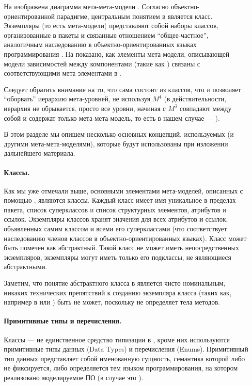 На  изображена диаграмма мета-мета-модели . Согласно объектно-ориентированной парадигме, центральным понятием в  является класс. Экземпляры  (то есть мета-модели) представляют собой наборы классов, организованные в пакеты и связанные отношением ``общее-частное'', аналогичным наследованию в объектно-ориентированных языках программирования \cite{OOP}. На  показано, как элементы мета-модели, описывающей модели зависимостей между компонентами (такие как ) связаны с соответствующими мета-элементами в .

Следует обратить внимание на то, что  сама состоит из классов, что и позволяет ``оборвать'' иерархию мета-уровней, не используя $M^4$ (в действительности, иерархия не обрывается, просто все уровни, начиная с $M^3$ совпадают между собой и содержат только мета-мета-модель, то есть в нашем случае --- ).

В этом разделе мы опишем несколько основных концепций, используемых  (и другими мета-мета-моделями), которые будут использованы при изложении дальнейшего материала.

\paragraph*{Классы.} Как мы уже отмечали выше, основными элементами мета-моделей, описанных с помощью , являются классы. Каждый класс имеет имя уникальное в пределах пакета, список суперклассов и список структурных элементов, атрибутов и ссылок. Экземпляры классов хранят значения для всех атрибутов и ссылок, объявленных самим классом и всеми его суперклассами (что соответствует наследованию членов классов в объектно-ориентированных языках). Класс может быть помечен как абстрактный. Такой класс не может иметь непосредственных экземпляров, экземпляры могут иметь только его подклассы, не являющиеся абстрактными.

Заметим, что понятие абстрактного класса в  является чисто номинальным, никаких технических препятствий к созданию экземпляра класса (таких как, например в  или ) быть не может, поскольку  не определяет тела методов. 

\paragraph*{Примитивные типы и перечисления.} Классы --- не единственное средство типизации в , кроме них используются примитивные типы данных (Data Types) и перечисления (Enums). Примитивный тип данных представляет собой именованную сущность, семантика которой либо не фиксируется, либо определяется тем языком программирования, на котором реализовано моделируемое ПО (в случае  это ). 

